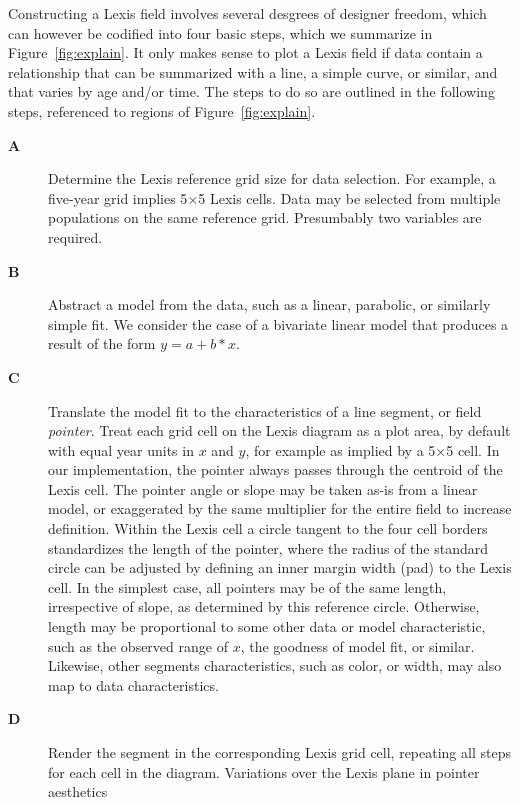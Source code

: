 \documentclass{article}
\begin{document}
Constructing a Lexis field involves several desgrees of designer freedom, which can however be codified into four basic steps, which we summarize in Figure~\ref{fig:explain}. It only makes sense to plot a Lexis field if data contain a relationship that can be summarized with a line, a simple curve, or similar, and that varies by age and/or time. The steps to do so are outlined in the following steps, referenced to regions of Figure~\ref{fig:explain}.
\begin{description}
\item[\textbf{A}] Determine the Lexis reference grid size for data selection. For example, a five-year grid implies 5$\times$5 Lexis cells. Data may be selected from multiple populations on the same reference grid. Presumbably two variables are required.
\item[\textbf{B}] Abstract a model from the data, such as a linear, parabolic, or similarly simple fit. We consider the case of a bivariate linear model that produces a result of the form $y = a + b*x$. 
\item[\textbf{C}] Translate the model fit to the characteristics of a line segment, or field \emph{pointer}. Treat each grid cell on the Lexis diagram as a plot area, by default with equal year units in $x$ and $y$, for example as implied by a 5$\times$5 cell. In our implementation, the pointer always passes through the centroid of the Lexis cell. The pointer angle or slope may be taken as-is from a linear model, or exaggerated by the same multiplier for the entire field to increase definition. Within the Lexis cell a circle tangent to the four cell borders standardizes the length of the pointer, where the radius of the standard circle can be adjusted by defining an inner margin width (pad) to the Lexis cell. In the simplest case, all pointers may be of the same length, irrespective of slope, as determined by this reference circle. Otherwise, length may be proportional to some other data or model characteristic, such as the observed range of $x$, the goodness of model fit, or similar. Likewise, other segments characteristics, such as color, or width, may also map to data characteristics.
\item[\textbf{D}] Render the segment in the corresponding Lexis grid cell, repeating all steps for each cell in the diagram. Variations over the Lexis plane in pointer aesthetics 
\end{description}
\end{document}
